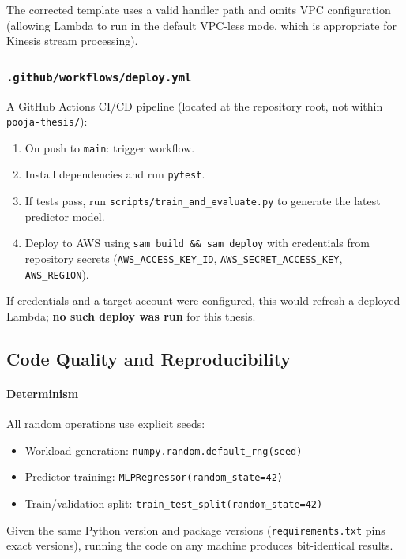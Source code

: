 The corrected template uses a valid handler path and omits VPC configuration (allowing Lambda to run in the default VPC-less mode, which is appropriate for Kinesis stream processing).

\subsubsection{\texttt{.github/workflows/deploy.yml}}

A GitHub Actions CI/CD pipeline (located at the repository root, not within \texttt{pooja-thesis/}):
\begin{enumerate}
  \item On push to \texttt{main}: trigger workflow.
  \item Install dependencies and run \texttt{pytest}.
  \item If tests pass, run \texttt{scripts/train\_and\_evaluate.py} to generate the latest predictor model.
  \item Deploy to AWS using \texttt{sam build \&\& sam deploy} with credentials from repository secrets (\texttt{AWS\_ACCESS\_KEY\_ID}, \texttt{AWS\_SECRET\_ACCESS\_KEY}, \texttt{AWS\_REGION}).
\end{enumerate}

If credentials and a target account were configured, this would refresh a deployed Lambda; \textbf{no such deploy was run} for this thesis.

\subsection{Code Quality and Reproducibility}

\paragraph{Determinism} All random operations use explicit seeds:
\begin{itemize}
  \item Workload generation: \texttt{numpy.random.default\_rng(seed)}
  \item Predictor training: \texttt{MLPRegressor(random\_state=42)}
  \item Train/validation split: \texttt{train\_test\_split(random\_state=42)}
\end{itemize}
Given the same Python version and package versions (\texttt{requirements.txt} pins exact versions), running the code on any machine produces bit-identical results.


